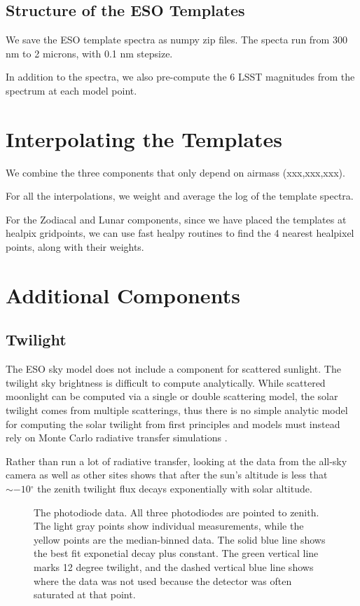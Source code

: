 \documentclass{emulateapj}  %
\newcommand\degree{{^\circ}}
\begin{document}
\citet{Noll12}

\subsection{Structure of the ESO Templates}

We save the ESO template spectra as numpy zip files.  The specta run from 300 nm to 2 microns, with 0.1 nm stepsize.

In addition to the spectra, we also pre-compute the 6 LSST magnitudes from the spectrum at each model point.

\section{Interpolating the Templates}

We combine the three components that only depend on airmass (xxx,xxx,xxx).

For all the interpolations, we weight and average the log of the template spectra.

For the Zodiacal and Lunar components, since we have placed the templates at healpix gridpoints, we can use fast healpy routines to find the 4 nearest healpixel points, along with their weights.  


\section{Additional Components}

\subsection{Twilight}

The ESO sky model does not include a component for scattered sunlight.  The twilight sky brightness is difficult to compute analytically.  While scattered moonlight can be computed via a single or double scattering model, the solar twilight comes from multiple scatterings, thus there is no simple analytic model for computing the solar twilight from first principles and models must instead rely on Monte Carlo radiative transfer simulations \citep{Patat06}.

Rather than run a lot of radiative transfer, looking at the data from the all-sky camera as well as other sites shows that after the sun's altitude is less that $\sim-10\degree$ the zenith twilight flux decays exponentially with solar altitude.

\begin{figure*}
  \caption{The photodiode data.  All three photodiodes are pointed to zenith. The light gray points show individual measurements, while the yellow points are the median-binned data. The solid blue line shows the best fit exponetial decay plus constant. The green vertical line marks 12 degree twilight, and the dashed vertical blue line shows where the data was not used because the detector was often saturated at that point. \label{diodePlot}}
\end{figure*}
\end{document}

